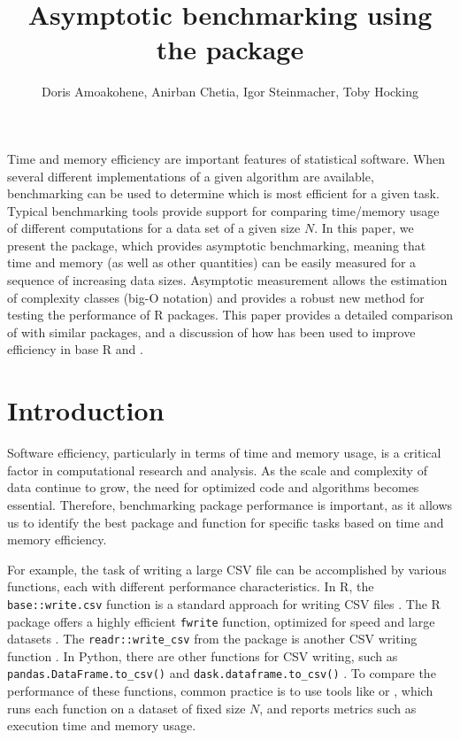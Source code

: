 \title{Asymptotic benchmarking using the  package}
\author{Doris Amoakohene, Anirban Chetia, Igor Steinmacher, Toby Hocking}

\maketitle

\abstract{}
Time and memory efficiency are important features of statistical software.
When several different implementations of a given algorithm are available, benchmarking can be used to determine which is most efficient for a given task.
Typical benchmarking tools provide support for comparing time/memory usage of different computations for a data set of a given size $N$.
In this paper, we present the  package, which provides asymptotic benchmarking, meaning that time and memory (as well as other quantities) can be easily measured for a sequence of increasing data sizes. 
Asymptotic measurement allows the estimation of complexity classes (big-O notation) and provides a robust new method for testing the performance of R packages.
This paper provides a detailed comparison of  with similar packages, and a discussion of how  has been used to improve efficiency in base R and . 

\section{Introduction}

Software efficiency, particularly in terms of time and memory usage, is a critical factor in computational research and analysis. As the scale and complexity of data continue to grow, the need for optimized code and algorithms becomes essential. 
Therefore, benchmarking package performance is important, as it allows us to identify the best package and function for specific tasks based on time and memory efficiency. 

For example, the task of writing a large CSV file can be accomplished by various functions, each with different performance characteristics. 
In R, the \texttt{base::write.csv} function is a standard approach for writing CSV files \citep{baseR}.
The R package  offers a highly efficient \texttt{fwrite} function, optimized for speed and large datasets \citep{data.table}. 
The \texttt{readr::write\_csv} from the  package is another CSV writing function \citep{readr}.
In Python, there are other functions for CSV writing, such as \texttt{pandas.DataFrame.to\_csv()} and \texttt{dask.dataframe.to\_csv()}  \citep{pandas, dask}.
To compare the performance of these functions, common practice is to use tools like  \citep{microbenchmark} or  \citep{bench}, which runs each function on a dataset of fixed size $N$, and reports metrics such as execution time and memory usage.  

